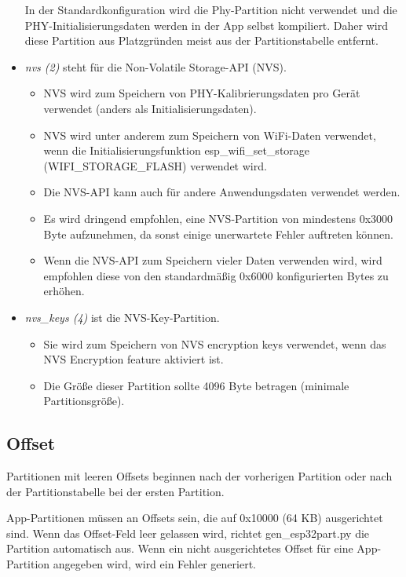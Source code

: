 \begin{itemize}
    In der Standardkonfiguration wird die Phy-Partition nicht verwendet und die PHY-Initialisierungsdaten werden in der App selbst kompiliert. Daher wird diese Partition aus Platzgründen meist aus der Partitionstabelle entfernt.
    \item \textit{nvs (2)} steht für die Non-Volatile Storage-API (\textmd{NVS}).
    \begin{itemize}
        \item \textmd{NVS} wird zum Speichern von PHY-Kalibrierungsdaten pro Gerät verwendet (anders als Initialisierungsdaten).
        \item \textmd{NVS} wird unter anderem zum Speichern von WiFi-Daten verwendet, wenn die Initialisierungsfunktion esp\_wifi\_set\_storage (WIFI\_STORAGE\_FLASH) verwendet wird.
        \item Die \textmd{NVS}-API kann auch für andere Anwendungsdaten verwendet werden.
        \item Es wird dringend empfohlen, eine \textmd{NVS}-Partition von mindestens 0x3000 Byte aufzunehmen, da sonst einige unerwartete Fehler auftreten können.
        \item Wenn die \textmd{NVS}-API zum Speichern vieler Daten verwenden wird, wird empfohlen diese von den standardmäßig 0x6000 konfigurierten Bytes zu erhöhen.
    \end{itemize}
    \item \textit{nvs\_keys (4)} ist die \textmd{NVS}-Key-Partition.
    \begin{itemize}
        \item Sie wird zum Speichern von \textmd{NVS} encryption keys verwendet, wenn das \textmd{NVS} Encryption feature aktiviert ist.
        \item Die Größe dieser Partition sollte 4096 Byte betragen (minimale Partitionsgröße).
    \end{itemize}
\end{itemize}

\subsection{Offset}
Partitionen mit leeren Offsets beginnen nach der vorherigen Partition oder nach der Partitionstabelle bei der ersten Partition.

App-Partitionen müssen an Offsets sein, die auf 0x10000 (64 KB) ausgerichtet sind. Wenn das Offset-Feld leer gelassen wird, richtet gen\_esp32part.py die Partition automatisch aus. Wenn ein nicht ausgerichtetes Offset für eine App-Partition angegeben wird, wird ein Fehler generiert.

